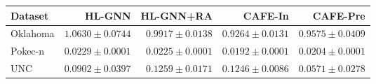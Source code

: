 \begin{tabular}{lrrrr}
\toprule
Dataset & HL-GNN & HL-GNN+RA & CAFE-In & CAFE-Pre \\
\midrule
Oklahoma & $1.0630 \pm 0.0744$ & $0.9917 \pm 0.0138$ & $0.9264 \pm 0.0131$ & $0.9575 \pm 0.0409$ \\
Pokec-n & $0.0229 \pm 0.0001$ & $0.0225 \pm 0.0001$ & $0.0192 \pm 0.0001$ & $0.0204 \pm 0.0001$ \\
UNC & $0.0902 \pm 0.0397$ & $0.1259 \pm 0.0171$ & $0.1246 \pm 0.0086$ & $0.0571 \pm 0.0278$ \\
\bottomrule
\end{tabular}
